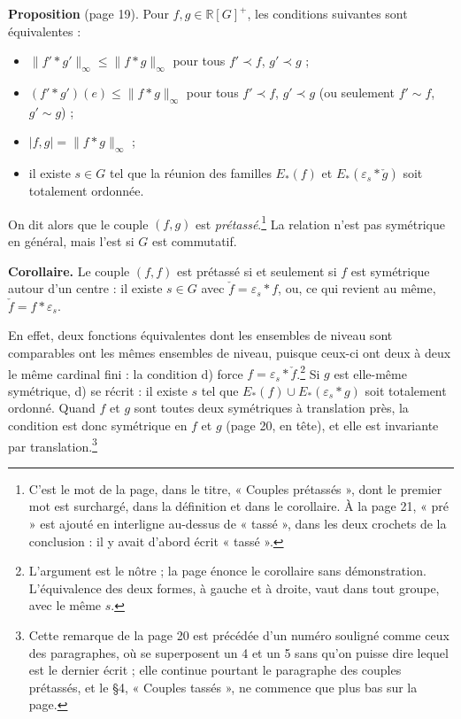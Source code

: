 \documentclass[11pt,a4paper]{article}
\begin{document}
\textbf{Proposition} (page 19). Pour $f, g \in \mathbb{R}[G]^+$, les
conditions suivantes sont équivalentes :
\begin{itemize}
  \item[a)] $\|f' * g'\|_\infty \leqslant \|f * g\|_\infty$ pour tous
  $f' \prec f$, $g' \prec g$ ;
  \item[b)] $(f' * g')(e) \leqslant \|f * g\|_\infty$ pour tous $f' \prec f$,
  $g' \prec g$ (ou seulement $f' \sim f$, $g' \sim g$) ;
  \item[c)] $|f, g| = \|f * g\|_\infty$ ;
  \item[d)] il existe $s \in G$ tel que la réunion des familles $E_*(f)$ et
  $E_*(\varepsilon_s * \check g)$ soit totalement ordonnée.
\end{itemize}
On dit alors que le couple $(f, g)$ est \emph{prétassé}.\footnote{C'est le
mot de la page, dans le titre, « Couples prétassés », dont le premier mot est
surchargé, dans la définition et dans le corollaire. À la page 21, « pré »
est ajouté en interligne au-dessus de « tassé », dans les deux crochets de
la conclusion : il y avait d'abord écrit « tassé ».} La relation n'est pas
symétrique en général, mais l'est si $G$ est commutatif.

\textbf{Corollaire.} Le couple $(f, f)$ est prétassé si et seulement si $f$
est symétrique autour d'un centre : il existe $s \in G$ avec
$\check f = \varepsilon_s * f$, ou, ce qui revient au même,
$\check f = f * \varepsilon_s$.

En effet, deux fonctions équivalentes dont les ensembles de niveau sont
comparables ont les mêmes ensembles de niveau, puisque ceux-ci ont deux à
deux le même cardinal fini : la condition d) force
$f = \varepsilon_s * \check f$.\footnote{L'argument est le nôtre ; la page
énonce le corollaire sans démonstration. L'équivalence des deux formes, à
gauche et à droite, vaut dans tout groupe, avec le même $s$.} Si $g$ est
elle-même symétrique, d) se récrit : il existe $s$ tel que
$E_*(f) \cup E_*(\varepsilon_s * g)$ soit totalement ordonné. Quand $f$ et $g$
sont toutes deux symétriques à translation près, la condition est donc
symétrique en $f$ et $g$ (page 20, en tête), et elle est invariante par
translation.\footnote{Cette remarque de la page 20 est précédée d'un numéro
souligné comme ceux des paragraphes, où se superposent un 4 et un 5 sans
qu'on puisse dire lequel est le dernier écrit ; elle continue pourtant le
paragraphe des couples prétassés, et le §4, « Couples tassés », ne commence
que plus bas sur la page.}
\end{document}
